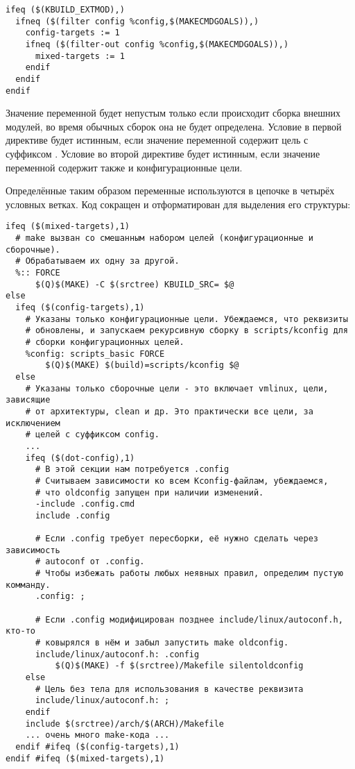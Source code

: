 \begin{verbatim}
ifeq ($(KBUILD_EXTMOD),)
  ifneq ($(filter config %config,$(MAKECMDGOALS)),)
    config-targets := 1
    ifneq ($(filter-out config %config,$(MAKECMDGOALS)),)
      mixed-targets := 1
    endif
  endif
endif
\end{verbatim}

Значение переменной  будет непустым только
если происходит сборка внешних модулей, во время обычных сборок она
не будет определена. Условие в первой директиве  будет
истинным, если значение переменной  содержит
цель с суффиксом . Условие во второй директиве
 будет истинным, если значение переменной
 содержит также и конфигурационные цели.

Определённые таким образом переменные используются в цепочке
 в четырёх условных ветках. Код сокращен и
отформатирован для выделения его структуры:

\begin{verbatim}
ifeq ($(mixed-targets),1)
  # make вызван со смешанным набором целей (конфигурационные и сборочные).
  # Обрабатываем их одну за другой.
  %:: FORCE
      $(Q)$(MAKE) -C $(srctree) KBUILD_SRC= $@
else
  ifeq ($(config-targets),1)
    # Указаны только конфигурационные цели. Убеждаемся, что реквизиты
    # обновлены, и запускаем рекурсивную сборку в scripts/kconfig для
    # сборки конфигурационных целей.
    %config: scripts_basic FORCE
        $(Q)$(MAKE) $(build)=scripts/kconfig $@
  else
    # Указаны только сборочные цели - это включает vmlinux, цели, зависящие
    # от архитектуры, clean и др. Это практически все цели, за исключением
    # целей с суффиксом config.
    ...
    ifeq ($(dot-config),1)
      # В этой секции нам потребуется .config
      # Считываем зависимости ко всем Kconfig-файлам, убеждаемся,
      # что oldconfig запущен при наличии изменений.
      -include .config.cmd
      include .config

      # Если .config требует пересборки, её нужно сделать через зависимость
      # autoconf от .config.
      # Чтобы избежать работы любых неявных правил, определим пустую комманду.
      .config: ;

      # Если .config модифицирован позднее include/linux/autoconf.h, кто-то
      # ковырялся в нём и забыл запустить make oldconfig.
      include/linux/autoconf.h: .config
          $(Q)$(MAKE) -f $(srctree)/Makefile silentoldconfig
    else
      # Цель без тела для использования в качестве реквизита
      include/linux/autoconf.h: ;
    endif
    include $(srctree)/arch/$(ARCH)/Makefile
    ... очень много make-кода ...
  endif #ifeq ($(config-targets),1)
endif #ifeq ($(mixed-targets),1)
\end{verbatim}

